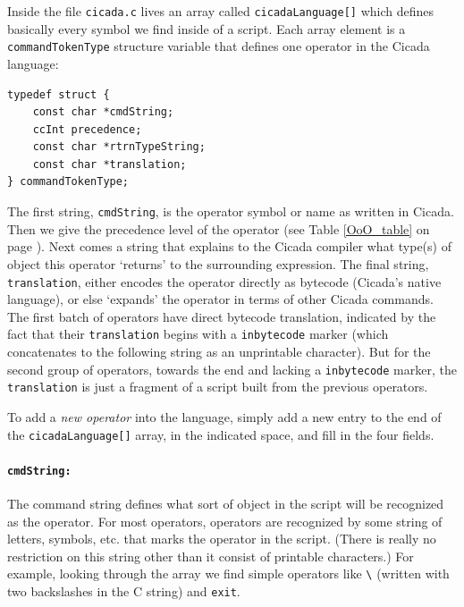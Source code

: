 \documentclass{article}
\newenvironment{code}{
       \begin{list}{}{
               \setlength{\leftmargin}{.4in}
               \setlength{\rightmargin}{0in}
               \setlength{\topsep}{.2in}
       }
       \small
       \item[] }
       { \end{list}   }
\begin{document}
Inside the file \verb#cicada.c# lives an array called \verb#cicadaLanguage[]# which defines basically every symbol we find inside of a script.  Each array element is a \verb#commandTokenType# structure variable that defines one operator in the Cicada language:

\begin{code} \begin{verbatim}
typedef struct {
    const char *cmdString;
    ccInt precedence;
    const char *rtrnTypeString;
    const char *translation;
} commandTokenType;
\end{verbatim} \end{code}

\noindent The first string, \verb#cmdString#, is the operator symbol or name as written in Cicada.  Then we give the precedence level of the operator (see Table \ref{OoO_table} on page \pageref{OoO_table}).  Next comes a string that explains to the Cicada compiler what type(s) of object this operator `returns' to the surrounding expression.  The final string, \verb#translation#, either encodes the operator directly as bytecode (Cicada's native language), or else `expands' the operator in terms of other Cicada commands.  The first batch of operators have direct bytecode translation, indicated by the fact that their \verb#translation# begins with a \verb#inbytecode# marker (which concatenates to the following string as an unprintable character).  But for the second group of operators, towards the end and lacking a \verb#inbytecode# marker, the \verb#translation# is just a fragment of a script built from the previous operators.

To add a \emph{new operator} into the language, simply add a new entry to the end of the \verb#cicadaLanguage[]# array, in the indicated space, and fill in the four fields.



\paragraph{\texttt{cmdString:}}  The command string defines what sort of object in the script will be recognized as the operator.  For most operators, operators are recognized by some string of letters, symbols, etc. that marks the operator in the script.  (There is really no restriction on this string other than it consist of printable characters.)  For example, looking through the array we find simple operators like \verb#\# (written with two backslashes in the C string) and \verb#exit#.
\end{document}
